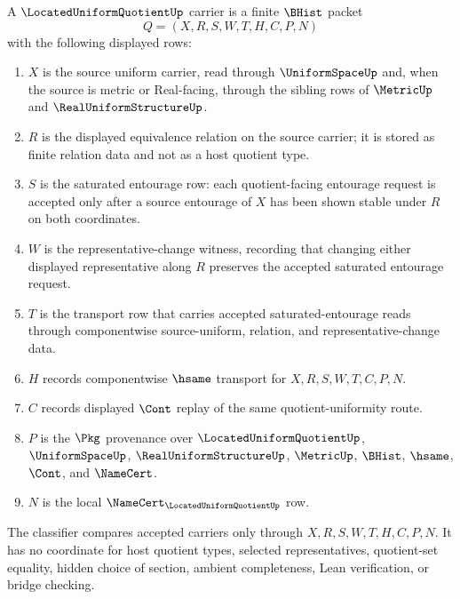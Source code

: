 \begin{definition}
\label{def:located-uniform-quotient-carrier}
A $\LocatedUniformQuotientUp$ carrier is a finite $\BHist$ packet
$$
Q=(X,R,S,W,T,H,C,P,N)
$$
with the following displayed rows:
\begin{enumerate}
\item $X$ is the source uniform carrier, read through $\UniformSpaceUp$ and, when the source is metric or Real-facing, through the sibling rows of $\MetricUp$ and $\RealUniformStructureUp$.
\item $R$ is the displayed equivalence relation on the source carrier; it is stored as finite relation data and not as a host quotient type.
\item $S$ is the saturated entourage row: each quotient-facing entourage request is accepted only after a source entourage of $X$ has been shown stable under $R$ on both coordinates.
\item $W$ is the representative-change witness, recording that changing either displayed representative along $R$ preserves the accepted saturated entourage request.
\item $T$ is the transport row that carries accepted saturated-entourage reads through componentwise source-uniform, relation, and representative-change data.
\item $H$ records componentwise $\hsame$ transport for $X,R,S,W,T,C,P,N$.
\item $C$ records displayed $\Cont$ replay of the same quotient-uniformity route.
\item $P$ is the $\Pkg$ provenance over $\LocatedUniformQuotientUp$, $\UniformSpaceUp$, $\RealUniformStructureUp$, $\MetricUp$, $\BHist$, $\hsame$, $\Cont$, and $\NameCert$.
\item $N$ is the local $\NameCert_{\LocatedUniformQuotientUp}$ row.
\end{enumerate}
The classifier compares accepted carriers only through $X,R,S,W,T,H,C,P,N$. It has no coordinate for host quotient types, selected representatives, quotient-set equality, hidden choice of section, ambient completeness, Lean verification, or bridge checking.
\end{definition}

